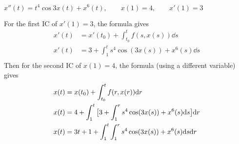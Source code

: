 $x''(t) = t^4 \cos 3x(t) + x^6(t), \qquad x(1) = 4, \qquad x'(1) = 3$

\nl For the first IC of $x'(1) = 3$, the formula gives
\begin{align*}
    x'(t) &= x'(t_0) + \int_{t_0}^t f(s, x(s)) \dd s \\
    x'(t) &= 3 + \int_{1}^t s^4 \cos (3x(s)) + x^6(s) \dd s \\
\end{align*}
Then for the second IC of $x(1) = 4$, the formula (using a different variable) gives
\begin{align*}
    x(t) &= x(t_0) + \int_{t_0}^t f(r, x(r)) \dd r \\
    x(t) &= 4 + \int_{1}^t \big[ {3 + \int_{1}^r s^4 \cos (3x(s)) + x^6(s) \dd s} \big]  \dd r \\
    x(t) &= 3t+1+ \int_1^t \int_1^r s^4 \cos(3x(s)) + x^6(s) \dd s \dd r
\end{align*}
